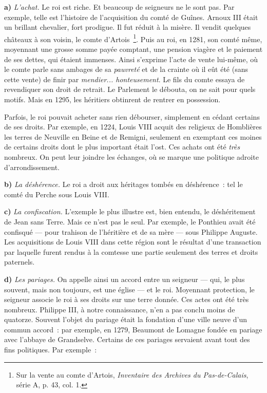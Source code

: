 \documentclass[french,twoside]{book} %
\newcommand{\labelchar}[1]{\textbf{\color{rubric} #1}}
\begin{document}
\noindent \labelchar{a)} {\itshape L’achat.} Le roi est riche. Et beaucoup de seigneurs ne le sont pas. Par exemple, telle est l’histoire de l’acquisition du comté de Guînes. Arnoux III était un brillant chevalier, fort prodigue. Il fut réduit à la misère. Il vendit quelques châteaux à son voisin, le comte d’Artois \footnote{ Sur la vente au comte d’Artois, {\itshape Inventaire des Archives du Pas-de-Calais}, série A, p. 43, col. 1.}. Puis au roi, en 1281, son comté même, moyennant une grosse somme payée comptant, une pension viagère et le paiement de ses dettes, qui étaient immenses. Ainsi s’exprime l’acte de vente lui-même, où le comte parle sans ambages de sa \emph{pauvreté} et de la crainte où il eût été (sans cette vente) de finir par \emph{mendier... honteusement}. Le fils du comte essaya de revendiquer son droit de retrait. Le Parlement le débouta, on ne sait pour quels motifs. Mais en 1295, les héritiers obtinrent de rentrer en possession.\par
Parfois, le roi pouvait acheter sans rien débourser, simplement en cédant certains de ses droits. Par exemple, en 1224, Louis VIII acquit des religieux de Homblières les terres de Neuville en Beine et de Remigni, seulement en exemptant ces moines de certains droits dont le plus important était l’ost. Ces achats ont été {\itshape très} nombreux. On peut leur joindre les échanges, où se marque une politique adroite d’arrondissement.\par
\bigbreak
\noindent \labelchar{b)} {\itshape La déshérence.} Le roi a droit aux héritages tombés en déshérence : tel le comté du Perche sous Louis VIII.\par
\bigbreak
\noindent \labelchar{c)} {\itshape La confiscation.} L’exemple le plus illustre est, bien entendu, le déshéritement de Jean sans Terre. Mais ce n’est pas le seul. Par exemple, le Ponthieu avait été confisqué — pour trahison de l’héritière et de sa mère — sous Philippe Auguste. Les acquisitions de Louis VIII dans cette région sont le résultat d’une transaction par laquelle furent rendus à la comtesse une partie seulement des terres et droits paternels.\par
\bigbreak
\noindent \labelchar{d)} {\itshape Les pariages.} On appelle ainsi un accord entre un seigneur — qui, le plus souvent, mais non toujours, est une église — et le roi. Moyennant protection, le seigneur associe le roi à ses droits sur une terre donnée. Ces actes ont été très nombreux. Philippe III, à notre connaissance, n’en a pas conclu moins de quatorze. Souvent l’objet du pariage était la fondation d’une ville neuve d’un commun accord : par exemple, en 1279, Beaumont de Lomagne fondée en pariage avec l’abbaye de Grandselve. Certains de ces pariages servaient avant tout des fins politiques. Par exemple :\par
\end{document}

